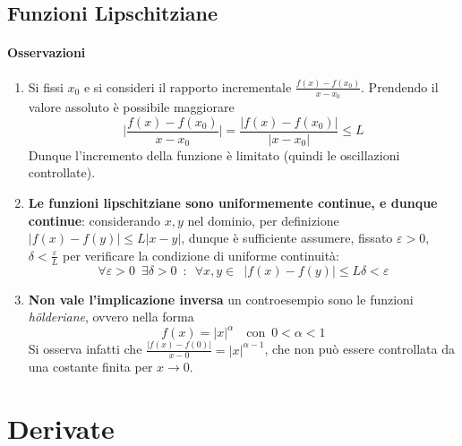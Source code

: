 \documentclass[10pt, oneside]{book}
\theoremstyle{plain}
\begin{document}
\section{Funzioni Lipschitziane}
\subsubsection{Osservazioni}
\begin{enumerate}
\item Si fissi $x_0$ e si consideri il rapporto incrementale $\displaystyle \frac{f(x) - f(x_0)}{x - x_0}$. Prendendo il valore assoluto è possibile maggiorare
\[\bigg|\frac{f(x) - f(x_0)}{x - x_0}\bigg| = \frac{|f(x) - f(x_0)|}{|x - x_0|} \leq L\]
Dunque l'incremento della funzione è limitato (quindi le oscillazioni controllate).
\item \textbf{Le funzioni lipschitziane sono uniformemente continue, e dunque continue}: considerando $x,y$ nel dominio, per definizione $|f(x) - f(y)| \leq L |x - y|$, dunque è sufficiente assumere, fissato $\varepsilon >0$, $\displaystyle \delta < \frac{\varepsilon}{L}$ per verificare la condizione di uniforme continuità:
\[\forall \varepsilon > 0 \enspace \exists \delta > 0 \enspace : \enspace \forall x,y \in  \enspace |f(x) - f(y)| \leq L\delta < \varepsilon\]
\item \textbf{Non vale l'implicazione inversa} un controesempio sono le funzioni \textit{h\"olderiane}, ovvero nella forma
\[f(x) = |x|^\alpha \quad \textrm{con} \enspace 0 < \alpha < 1\]
Si osserva infatti che $\displaystyle \frac{|f(x) - f(0)|}{x - 0} = |x|^{\alpha - 1}$, che non può essere controllata da una costante finita per $x \rightarrow 0$.
\end{enumerate}



\chapter{Derivate}
\end{document}
